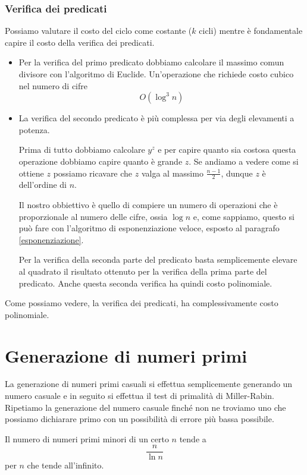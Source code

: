 \subsubsection{Verifica dei predicati}
Possiamo valutare il costo del ciclo come costante ($k$ cicli) mentre \`e fondamentale capire il costo della verifica
dei predicati.
\begin{itemize}
	\item Per la verifica del primo predicato dobbiamo calcolare il massimo comun divisore con l'algoritmo di Euclide.
	      Un'operazione che richiede costo cubico nel numero di cifre
	      \[ O(\log^3 n) \]
	\item La verifica del secondo predicato \`e pi\`u complessa per via degli elevamenti a potenza.

	      Prima di tutto dobbiamo calcolare $y^z$ e per capire quanto sia costosa questa operazione dobbiamo capire
	      quanto \`e grande $z$. Se andiamo a vedere come si ottiene $z$ possiamo ricavare che $z$ valga al massimo
	      $\frac{n-1}{2}$, dunque $z$ \`e dell'ordine di $n$.

	      Il nostro obbiettivo \`e quello di compiere un numero di operazioni che \`e proporzionale al numero delle
	      cifre, ossia $\log n$ e, come sappiamo, questo si pu\`o fare con l'algoritmo di esponenziazione veloce,
	      esposto al paragrafo \ref{esponenziazione}.

	      Per la verifica della seconda parte del predicato basta semplicemente elevare al quadrato il risultato ottenuto
	      per la verifica della prima parte del predicato. Anche questa seconda verifica ha quindi costo polinomiale.
\end{itemize}
Come possiamo vedere, la verifica dei predicati, ha complessivamente costo polinomiale.

\section{Generazione di numeri primi}\label{generazione_primi}
La generazione di numeri primi casuali si effettua semplicemente generando un numero casuale e in seguito si effettua
il test di primalit\`a di Miller-Rabin. Ripetiamo la generazione del numero casuale finch\'e non ne troviamo uno che
possiamo dichiarare primo con un possibilit\`a di errore pi\`u bassa possibile.

\begin{theorem}
	Il numero di numeri primi minori di un certo $n$ tende a
	\[ \frac{n}{\ln n} \]
	per $n$ che tende all'infinito.
\end{theorem}

